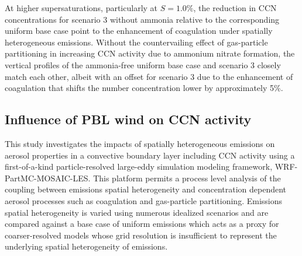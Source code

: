 \documentclass[journal abbreviation, manuscript]{copernicus}
\begin{document}
At higher supersaturations, particularly at $S=1.0\%$, the reduction in CCN concentrations for scenario 3 without ammonia relative to the corresponding uniform base case point to the enhancement of coagulation under spatially heterogeneous emissions. Without the countervailing effect of gas-particle partitioning in increasing CCN activity due to ammonium nitrate formation, the vertical profiles of the ammonia-free uniform base case and scenario 3 closely match each other, albeit with an offset for scenario 3 due to the enhancement of coagulation that shifts the number concentration lower by approximately 5\%.  

\subsection{Influence of PBL wind on CCN activity}\label{sec:influence-wind}

\conclusions  %


This study investigates the impacts of spatially heterogeneous emissions on aerosol properties in a convective boundary layer including CCN activity using a first-of-a-kind particle-resolved large-eddy simulation modeling framework, WRF-PartMC-MOSAIC-LES. This platform permits a process level analysis of the coupling between emissions spatial heterogeneity and concentration dependent aerosol processes such as coagulation and gas-particle partitioning. Emissions spatial heterogeneity is varied using numerous idealized scenarios and are compared against a base case of uniform emissions which acts as a proxy for coarser-resolved models whose grid resolution is insufficient to represent the underlying spatial heterogeneity of emissions.
\end{document}
